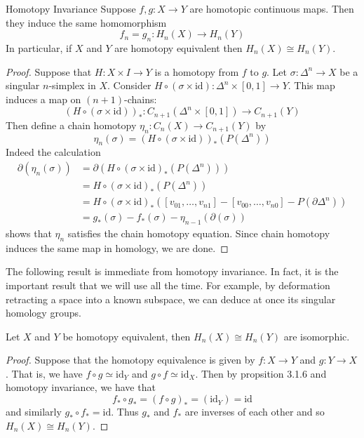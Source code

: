 \documentclass[a4paper]{article}
\begin{document}
\begin{thm}{Homotopy Invariance}{} Suppose $f,g:X\to Y$ are homotopic continuous maps. Then they induce the same homomorphism $$f_n=g_n:H_n(X)\to H_n(Y)$$ In particular, if $X$ and $Y$ are homotopy equivalent then $H_n(X)\cong H_n(Y)$. \tcbline
\begin{proof}
Suppose that $H:X\times I\to Y$ is a homotopy from $f$ to $g$. Let $\sigma:\Delta^n\to X$ be a singular $n$-simplex in $X$. Consider $H\circ(\sigma\times\text{id}):\Delta^n\times[0,1]\to Y$. This map induces a map on $(n+1)$-chains: $$(H\circ(\sigma\times\text{id}))_\ast:C_{n+1}(\Delta^n\times[0,1])\to C_{n+1}(Y)$$ Then define a chain homotopy $\eta_n:C_n(X)\to C_{n+1}(Y)$ by $$\eta_n(\sigma)=(H\circ(\sigma\times\text{id}))_\ast(P(\Delta^n))$$ Indeed the calculation
\begin{align*}
\partial(\eta_n(\sigma))&=\partial(H\circ(\sigma\times\text{id})_\ast(P(\Delta^n)))\tag{Definition of $\eta_n$}\\
&=H\circ(\sigma\times\text{id})_\ast(P(\Delta^n))\tag{Chain map}\\
&=H\circ(\sigma\times\text{id})_\ast([v_{01},\dots,v_{n1}]-[v_{00},\dots,v_{n0}]-P(\partial\Delta^n))\tag{By the above lemma}\\
&=g_\ast(\sigma)-f_\ast(\sigma)-\eta_{n-1}(\partial(\sigma))
\end{align*}
shows that $\eta_n$ satisfies the chain homotopy equation. Since chain homotopy induces the same map in homology, we are done. 
\end{proof}
\end{thm}

The following result is immediate from homotopy invariance. In fact, it is the important result that we will use all the time. For example, by deformation retracting a space into a known subspace, we can deduce at once its singular homology groups. 

\begin{crl}{}{} Let $X$ and $Y$ be homotopy equivalent, then $H_n(X)\cong H_n(Y)$ are isomorphic. \tcbline
\begin{proof}
Suppose that the homotopy equivalence is given by $f:X\to Y$ and $g:Y\to X$. That is, we have $f\circ g\simeq\text{id}_Y$ and $g\circ f\simeq\text{id}_X$. Then by propsition 3.1.6 and homotopy invariance, we have that $$f_\ast\circ g_\ast=(f\circ g)_\ast=(\text{id}_Y)=\text{id}$$ and similarly $g_\ast\circ f_\ast=\text{id}$. Thus $g_\ast$ and $f_\ast$ are inverses of each other and so $H_n(X)\cong H_n(Y)$. 
\end{proof}
\end{crl}
\end{document}
